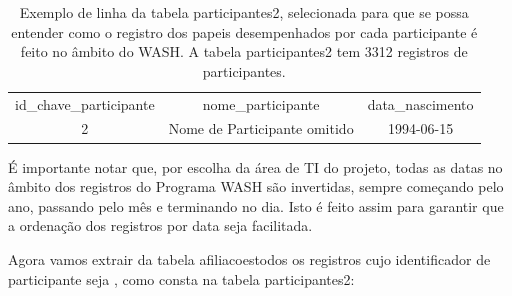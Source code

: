 \documentclass[
12pt,		%
openright,	%
twoside,  %
a4paper,			%
chapter=TITLE,		%
english,			%
french,				%
spanish,			%
brazil				%
]{USPSC-classe/USPSC}
\begin{document}
\begin{table}[htb]
\tiny
\caption{\label{2c8d9dda4031f0ea459292d025586b4d3e57ed84}Exemplo de linha da tabela participantes2, selecionada para que se possa entender como o registro dos papeis desempenhados por cada participante \'e feito no \^ambito do WASH. A tabela participantes2 tem 3312 registros de participantes.}

\centering
\begin{tabular}{|c|c|c|}
\hline
id\_chave\_participante  &  nome\_participante             &  data\_nascimento  \\
                     2  &  Nome de Participante omitido  &  1994-06-15 \\
\hline
\end{tabular}
\end{table}


\'E importante notar que, por escolha da \'area de TI do projeto, todas as datas no \^ambito dos registros do Programa WASH s\~ao invertidas, sempre come\c{c}ando pelo ano, passando pelo m\^es e terminando no dia. Isto \'e feito assim para garantir que a ordena\c{c}\~ao dos registros por data seja facilitada.









Agora vamos extrair da tabela \textquotedbl afiliacoes\textquotedbl  todos os registros cujo identificador de participante seja \textquotedbl , como consta na tabela participantes2:
\end{document}
